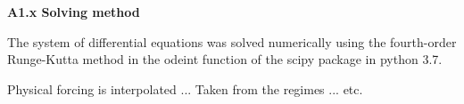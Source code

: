 \documentclass[11pt,letterpaper,english]{article}
\begin{document}
{\bf {\large A1.x Solving method}}

The system of differential equations was solved numerically using the fourth-order Runge-Kutta method in the odeint function of the scipy package in python 3.7. 

Physical forcing is interpolated ... Taken from the regimes ... etc.

%
%
% 
\end{document}
